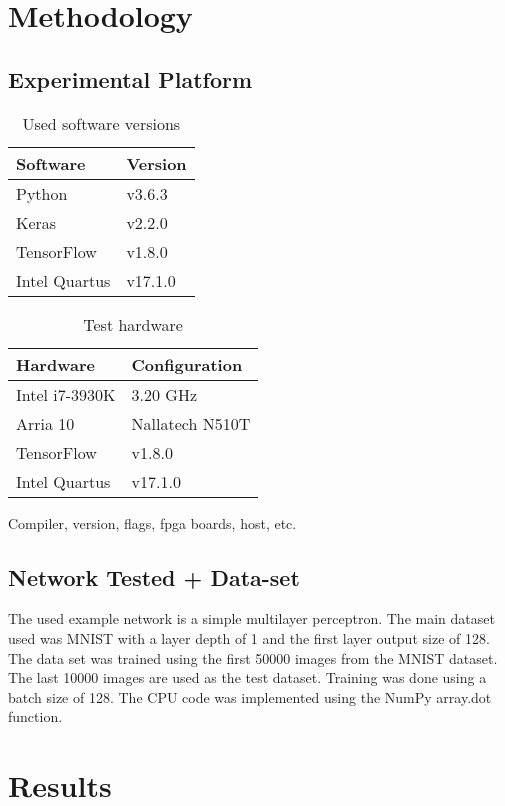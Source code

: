 \documentclass[techrep,english]{ipsj}
\begin{document}
\section{Methodology}\label{sec:method}
\subsection{Experimental Platform}
\begin{table}[h]\label{tab:software-versions}
  \caption{Used software versions}
  \begin{tabular}{ll}
    \toprule
    \textbf{Software} & \textbf{Version} \\
    \midrule
    Python & v3.6.3 \\
    Keras & v2.2.0 \\
    TensorFlow & v1.8.0 \\
    Intel Quartus & v17.1.0 \\
    \bottomrule
  \end{tabular}
\end{table}
\begin{table}[h]\label{tab:test-hardware}
  \caption{Test hardware}
  \begin{tabular}{ll}
    \toprule
    \textbf{Hardware} & \textbf{Configuration} \\
    \midrule
    Intel i7-3930K & 3.20 GHz \\
    Arria 10 & Nallatech N510T \\
    TensorFlow & v1.8.0 \\
    Intel Quartus & v17.1.0 \\
    \bottomrule
  \end{tabular}
\end{table}
Compiler, version, flags, fpga boards, host, etc.
\subsection{Network Tested + Data-set}
The used example network is a simple multilayer perceptron.
The main dataset used was MNIST with a layer depth of 1 and the first layer output size of 128.
The data set was trained using the first \num{50000} images from the MNIST dataset.
The last \num{10000} images are used as the test dataset.
Training was done using a batch size of 128.
The CPU code was implemented using the NumPy array.dot function.

\section{Results}\label{sec:result}
\end{document}
